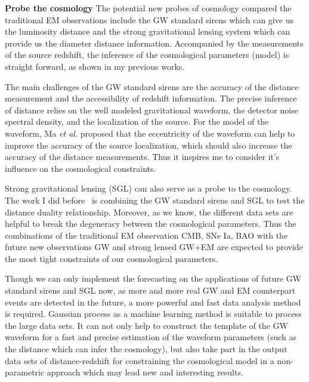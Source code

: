 \documentclass[11pt,letterpaper,sans]{moderncv}   %
\begin{document}
\vspace{2mm}
\noindent
\textcolor{color1}{\textbf{Probe the cosmology}}
The potential new probes of cosmology compared the traditional EM observations include the GW standard sirens which can give us the luminosity distance and the strong gravitational lensing system which can provide us the diameter distance information. Accompanied by the measurements of the source redshift, the inference of the cosmological parameters (model) is straight forward, as shown in my previous works.

\vspace{2mm}
\noindent
The main challenges of the GW standard sirens are the accuracy of the distance measurement and the accessibility of redshift information. The precise inference of distance relies on the well modeled gravitational waveform, the detector noise spectral density, and the localization of the source. For the model of the waveform, Ma \textit{et al.} proposed that the eccentricity of the waveform can help to improve the accuracy of the source localization, which should also increase the accuracy of the distance measurements. Thus it inspires me to consider it's influence on the cosmological constraints.

\vspace{2mm}
\noindent
Strong gravitational lensing (SGL) can also serve as a probe to the cosmology. The work I did before~\cite{Yang:2017bkv} is combining the GW standard sirens and SGL to test the distance duality relationship. Moreover, as we know, the different data sets are helpful to break the degeneracy between the cosmological parameters. Thus the combinations of the traditional EM observation CMB, SNe Ia, BAO with the future new observations GW and strong lensed GW+EM are expected to provide the most tight constraints of our cosmological parameters. 

\vspace{2mm}
\noindent
Though we can only implement the forecasting on the applications of future GW standard sirens and SGL now, as more and more real GW and EM counterpart events 
are detected in the future, a more powerful and fast data analysis method is required. Gaussian process as a machine learning method is suitable to process the large data sets. It can not only help to construct the template of the GW waveform for a fast and precise estimation of the waveform parameters (such as the distance which can infer the cosmology), but also take part in the output data sets of distance-redshift for constraining the cosmological model in a non-parametric approach which may lead new and interesting results.  
\end{document}
